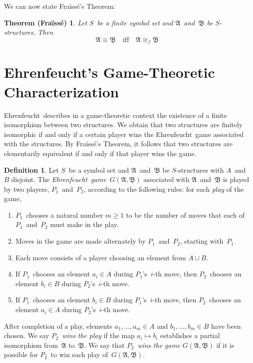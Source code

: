 \documentclass[letterpaper]{article}
\newcommand{\A}{\mathfrak{A}}
\newcommand{\B}{\mathfrak{B}}
\newcommand{\union}{\cup}
\newcommand{\iso}{\cong}
\newcommand{\fiso}{\iso_f}
\newcommand{\ef}{Ehrenfeucht}
\newcommand{\fr}{Fra\"iss\'e}
\numberwithin{equation}{section}
\theoremstyle{plain}
\newtheorem{frt}[equation]{Theorem (\fr)}
\theoremstyle{definition}
\newtheorem{defn}[equation]{Definition}
\begin{document}
We can now state \fr's Theorem:
\begin{frt}
Let $S$~be a finite symbol set and $\A$~and~$\B$ be $S$-structures. Then
$$\A\equiv\B\quad\text{iff}\quad\A\fiso\B$$
\end{frt}

\section{\ef's Game-Theoretic Characterization}
\noindent \ef\ describes in a game-theoretic context the existence of a finite isomorphism between two structures. We obtain that two structures are finitely isomorphic if and only if a certain player wins the \ef\ game associated with the structures. By \fr's Theorem, it follows that two structures are elementarily equivalent if and only if that player wins the game.

\begin{defn}
Let $S$~be a symbol set and $\A$~and~$\B$ be $S$-structures with $A$~and~$B$ disjoint. The \emph{\ef\ game}~$G(\A,\B)$ associated with $\A$~and~$\B$ is played by two players, $P_1$~and~$P_2$, according to the following rules: for each \emph{play} of the game,
\begin{enumerate}[itemsep=0pt]
\item $P_1$~chooses a natural number $m\ge 1$ to be the number of moves that each of $P_1$~and~$P_2$ must make in the play.
\item Moves in the game are made alternately by $P_1$~and~$P_2$, starting with~$P_1$.
\item Each move consists of a player choosing an element from $A\union B$.
\item If $P_1$~chooses an element $a_i\in A$ during $P_1$'s~$i$-th move, then $P_2$~chooses an element $b_i\in B$ during $P_2$'s~$i$-th move.
\item If $P_1$~chooses an element $b_i\in B$ during $P_1$'s~$i$-th move, then $P_2$~chooses an element $a_i\in A$ during $P_2$'s~$i$-th move.
\end{enumerate}
After completion of a play, elements $a_1,\ldots,a_m\in A$ and $b_1,\ldots,b_m\in B$ have been chosen. We say \emph{$P_2$~wins the play} if the map $a_i\mapsto b_i$ establishes a partial isomorphism from~$\A$ to~$\B$. We say that \emph{$P_2$~wins the game $G(\A,\B)$} if it is possible for $P_2$~to win each play of~$G(\A,\B)$.
\end{defn}
\end{document}

